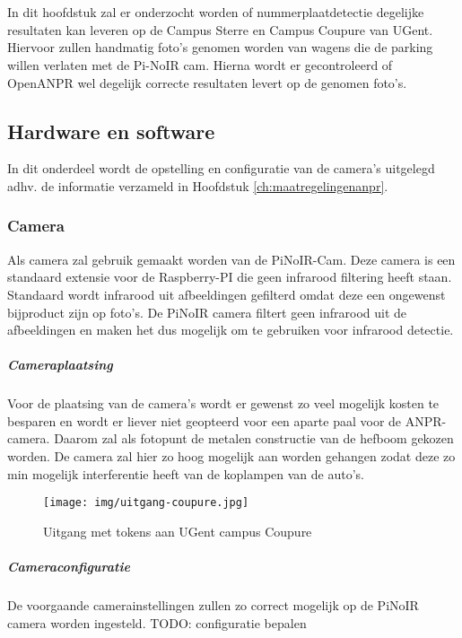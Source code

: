 
\chapter{}
\label{ch:praktischeUitvoering}
In dit hoofdstuk zal er onderzocht worden of nummerplaatdetectie degelijke resultaten kan leveren op de Campus Sterre en Campus Coupure van UGent. Hiervoor zullen handmatig foto's genomen worden van wagens die de parking willen verlaten met de Pi-NoIR cam. Hierna wordt er gecontroleerd of OpenANPR wel degelijk correcte resultaten levert op de genomen foto's.


\section{Hardware en software}
In dit onderdeel wordt de opstelling en configuratie van de camera's uitgelegd adhv. de informatie verzameld in Hoofdstuk \ref{ch:maatregelingenanpr}.

\subsection{Camera}
Als camera zal gebruik gemaakt worden van de PiNoIR-Cam. Deze camera is een standaard extensie voor de Raspberry-PI die geen infrarood filtering heeft staan. Standaard wordt infrarood uit afbeeldingen gefilterd omdat deze een ongewenst bijproduct zijn op foto's. De PiNoIR camera filtert geen infrarood uit de afbeeldingen en maken het dus mogelijk om te gebruiken voor infrarood detectie.

\paragraph{Cameraplaatsing}
Voor de plaatsing van de camera's wordt er gewenst zo veel mogelijk kosten te besparen en wordt er liever niet geopteerd voor een aparte paal voor de ANPR-camera. Daarom zal als fotopunt de metalen constructie van de hefboom gekozen worden. De camera zal hier zo hoog mogelijk aan worden gehangen zodat deze zo min mogelijk interferentie heeft van de koplampen van de auto's.

\begin{figure}[h!]
	\centering
	\texttt{[image: img/uitgang-coupure.jpg]}
	\caption{Uitgang met tokens aan UGent campus Coupure}
\end{figure}

\paragraph{Cameraconfiguratie}
De voorgaande camerainstellingen zullen zo correct mogelijk op de PiNoIR camera worden ingesteld.
TODO: configuratie bepalen

